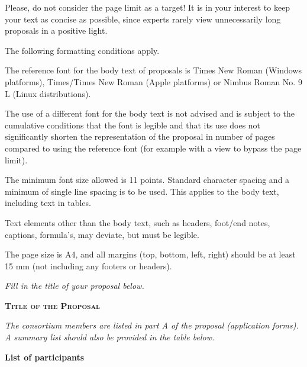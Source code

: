 Please, do not consider the page limit as a target! It is in your
interest to keep your text as concise as possible, since experts rarely
view unnecessarily long proposals in a positive light.

The following formatting conditions apply.

The reference font for the body text of proposals is Times New Roman
(Windows platforms), Times/Times New Roman (Apple platforms) or Nimbus
Roman No. 9 L (Linux distributions).

The use of a different font for the body text is not advised and is
subject to the cumulative conditions that the font is legible and that
its use does not significantly shorten the representation of the
proposal in number of pages compared to using the reference font (for
example with a view to bypass the page limit).

The minimum font size allowed is 11 points. Standard character spacing
and a minimum of single line spacing is to be used. This applies to the
body text, including text in tables.

Text elements other than the body text, such as headers, foot/end notes,
captions, formula's, may deviate, but must be legible.

The page size is A4, and all margins (top, bottom, left, right) should
be at least 15 mm (not including any footers or headers).

\emph{Fill in the title of your proposal below.}

\textbf{\textsc{Title of the Proposal}}

\emph{The consortium members are listed in part A of the proposal
(application forms). A summary list should also be provided in the table
below.}

\textbf{List of participants}

